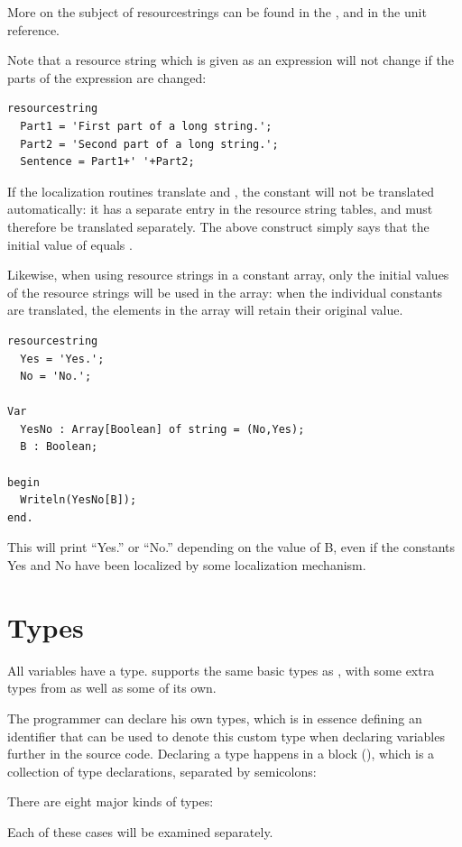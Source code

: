 More on the subject of resourcestrings can be found in the \progref, and
in the  unit reference.

\begin{remark}
Note that a resource string which is given as an expression will not change if
the parts of the expression are changed:
\begin{verbatim}
resourcestring
  Part1 = 'First part of a long string.';
  Part2 = 'Second part of a long string.';
  Sentence = Part1+' '+Part2;
\end{verbatim}
If the localization routines translate  and , the
 constant will not be translated automatically: it has a
separate entry in the resource string tables, and must therefore be
translated separately. The above construct simply says that the
initial value of  equals .
\end{remark}

\begin{remark}
Likewise, when using resource strings in a constant array, only the initial
values of the resource strings will be used in the array: when the
individual constants are translated, the elements in the array will retain
their original value.
\begin{verbatim}
resourcestring
  Yes = 'Yes.';
  No = 'No.';

Var
  YesNo : Array[Boolean] of string = (No,Yes);
  B : Boolean;

begin
  Writeln(YesNo[B]);
end.
\end{verbatim}
This will print ``Yes.'' or ``No.'' depending on the value of B, even if the
constants Yes and No have been localized by some localization mechanism.
\end{remark}

\chapter{Types}
All variables have a type. \fpc supports the same basic types as \tp, with
some extra types from \delphi as well as some of its own.

The programmer can declare his own types, which is in essence defining an identifier
that can be used to denote this custom type when declaring variables further
in the source code. Declaring a type happens
in a  block (), which is a collection of type declarations, separated
by semicolons:

There are eight major kinds of types:

Each of these cases will be examined separately.

